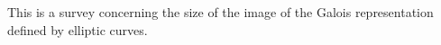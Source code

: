 This is a survey concerning the size of the image of the 
Galois representation defined by elliptic curves.